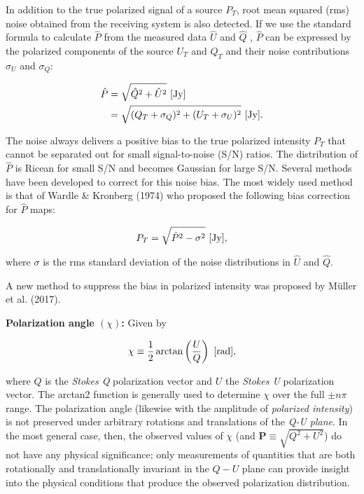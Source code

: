 \documentclass[a4paper,10pt]{article}
\begin{document}
{\noindent}In addition to the true polarized signal of a source $P_T$, root mean squared (rms) noise obtained from the receiving system is also detected. If we use the standard formula to calculate $\hat{P}$ from the measured data $\hat{U}$ and $\hat{Q}$ , $\hat{P}$ can be expressed by the polarized components of the source $U_T$ and $Q_T$ and their noise contributions $\sigma_U$ and $\sigma_Q$:

\begin{align*}
    \hat{P} &= \sqrt{\hat{Q}^2 + \hat{U}^2} ~ [{\rm Jy}] \\
                &= \sqrt{(Q_T+\sigma_Q)^2 + (U_T+\sigma_U)^2} ~ [{\rm Jy}].
\end{align*}

{\noindent}The noise always delivers a positive bias to the true polarized intensity $P_T$ that cannot be separated out for small signal-to-noise (S/N) ratios. The distribution of $\hat{P}$ is Ricean for small S/N and becomes Gaussian for large S/N. Several methods have been developed to correct for this noise bias. The most widely used method is that of Wardle \& Kronberg (1974) who proposed the following bias correction for $\hat{P}$ maps:

\begin{align*}
    P_T = \sqrt{\hat{P}^2 - \sigma^2} ~ [{\rm Jy}],
\end{align*}

{\noindent}where $\sigma$ is the rms standard deviation of the noise distributions in $\hat{U}$ and $\hat{Q}$.

{\noindent}A new method to suppress the bias in polarized intensity was proposed by M\"{u}ller et al. (2017).

{\noindent}\textbf{Polarization angle $(\chi)$:} Given by

\begin{align*}
    \chi\equiv\frac{1}{2}\arctan\left(\frac{U}{Q}\right) ~ [{\rm rad}],
\end{align*}

{\noindent}where $Q$ is the \textit{Stokes Q} polarization vector and $U$ the \textit{Stokes U} polarization vector. The arctan2 function is generally used to determine $\chi$ over the full $\pm n\pi$ range. The polarization angle (likewise with the amplitude of \textit{polarized intensity}) is not preserved under arbitrary rotations and translations of the \textit{Q-U plane}. In the most general case, then, the observed values of $\chi$ (and $\mathbf{P}\equiv\sqrt{Q^2+U^2}$) do not have any physical significance; only measurements of quantities that are both rotationally and translationally invariant in the $Q-U$ plane can provide insight into the physical conditions that produce the observed polarization distribution.
\end{document}
